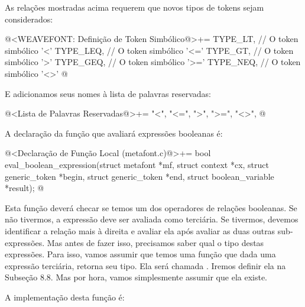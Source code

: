 {{{{{{As relações mostradas acima requerem que novos tipos de tokens sejam
considerados:

\iniciocodigo
@<WEAVEFONT: Definição de Token Simbólico@>+=
TYPE_LT,                    // O token simbólico '<'
TYPE_LEQ,                   // O token simbólico '<='
TYPE_GT,                    // O token simbólico '>'
TYPE_GEQ,                   // O token simbólico '>='
TYPE_NEQ,                   // O token simbólico '<>'
@
\fimcodigo

E adicionamos seus nomes à lista de palavras reservadas:

\iniciocodigo
@<Lista de Palavras Reservadas@>+=
"<", "<=", ">", ">=", "<>",
@
\fimcodigo

A declaração da função que avaliará expressões booleanas é:

\iniciocodigo
@<Declaração de Função Local (metafont.c)@>+=
bool eval_boolean_expression(struct metafont *mf, struct context *cx,
                             struct generic_token *begin,
                             struct generic_token *end,
                             struct boolean_variable *result);
@
\fimcodigo

Esta função deverá checar se temos um dos operadores de relações
booleanas. Se não tivermos, a expressão deve ser avaliada como
terciária. Se tivermos, devemos identificar a relação mais à direita e
avaliar ela após avaliar as duas outras sub-expressões. Mas antes de
fazer isso, precisamos saber qual o tipo destas expressões. Para isso,
vamos assumir que temos uma função que dada uma expressão terciária,
retorna seu tipo. Ela será
chamada . Iremos definir
ela na Subseção 8.8. Mas por hora, vamos simplesmente assumir que ela
existe.

A implementação desta função é:

}}}}}}
